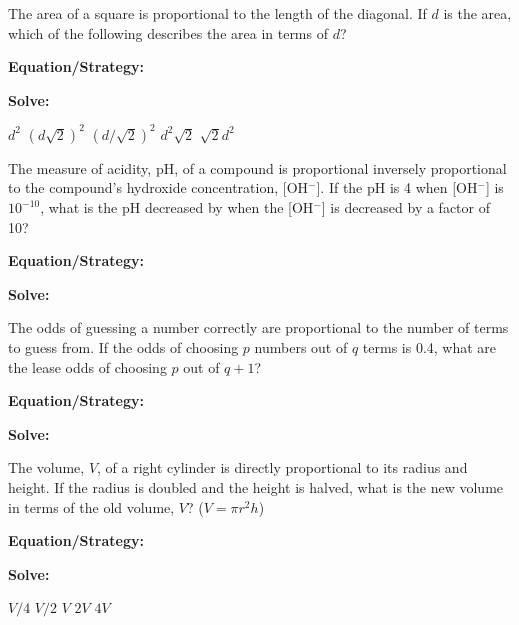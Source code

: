 \vfill
\newpage
\begin{multicols*}{2}
\begin{outline}[enumerate]
\medium

\1 The area of a square is proportional to the length of the diagonal. If $d$ is the area, which of the following describes the area in terms of $d$?

\bigskip
\textbf{Equation/Strategy:} \hrulefill

\bigskip
\textbf{Solve:}

\vfill
\2 $d^2$
\2 $(d\sqrt2)^2$
\2 $(d/\sqrt2)^2$
\2 $d^2\sqrt2$
\2 $\sqrt2d^2$

\midline

\1 The measure of acidity, pH, of a compound is proportional inversely proportional to the compound's hydroxide concentration, [OH$^-$]. If the pH is 4 when [OH$^-$] is $10^{-10}$, what is the pH decreased by when the [OH$^-$] is decreased by a factor of 10?

\bigskip
\textbf{Equation/Strategy:} \hrulefill

\bigskip
\textbf{Solve:}

\vfill
{}

\columnbreak
\advanced

\1 The odds of guessing a number correctly are proportional to the number of terms to guess from. If the odds of choosing $p$ numbers out of $q$ terms is 0.4, what are the lease odds of choosing $p$ out of $q+1$?

\bigskip
\textbf{Equation/Strategy:} \hrulefill

\bigskip
\textbf{Solve:}

\vfill
{}

\midline

\1 The volume, $V$, of a right cylinder is directly proportional to its radius and height. If the radius is doubled and the height is halved, what is the new volume in terms of the old volume, $V$? ($V=\pi r^2h$)

\bigskip
\textbf{Equation/Strategy:} \hrulefill

\bigskip
\textbf{Solve:}

\vfill
\2 $V/4$
\2 $V/2$
\2 $V$
\2 $2V$
\2 $4V$
\end{outline}
\end{multicols*}
